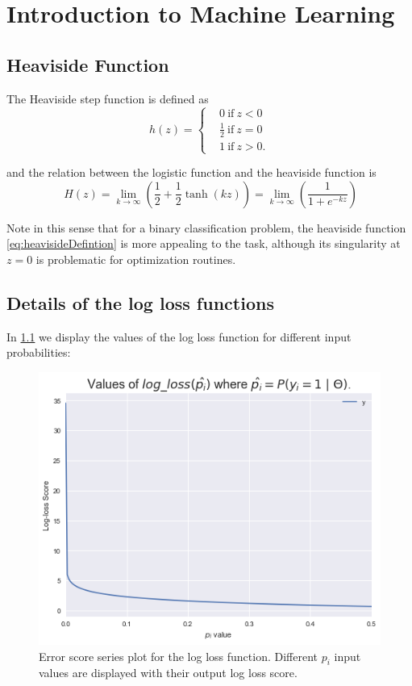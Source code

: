 \appendix
\chapter{Introduction to Machine Learning}\label{appx:introMachineLearning}

\section{Heaviside Function}\label{appx:sec:heaviside}

The Heaviside step function is defined as
\begin{equation}\label{eq:heavisideDefintion}
h(z) =
\begin{cases}
&0 \ \mbox{if} \ z<0 \\
&\frac{1}{2} \ \mbox{if} \ z=0 \\
&1 \ \mbox{if} \ z>0.
\end{cases}
\end{equation}

and the relation between the logistic function and the heaviside function is
\begin{equation}
 \ H(z) = \lim_{k \to \infty} \left(\frac{1}{2} + \frac{1}{2}\tanh(kz) \right) = \lim_{k \to \infty} \left(\frac{1}{1+e^{-kz}} \right)
\end{equation}

Note in this sense that for a binary classification problem, the heaviside function \cref{eq:heavisideDefintion} is more appealing to the task, although its singularity at $z=0$ is problematic for optimization routines.

\section{Details of the log loss functions}\label{appx:sec:loglossDetails}

In \cref{figure-logLossValues} we display the values of the log loss function for different input probabilities:

\begin{figure}[h!]
\begin{center}
\includegraphics[width=0.7\columnwidth]{figures/logloss/figure-logLossValues.png}
\caption{ Error score series plot for the log loss function.
Different $p_i$ input values are displayed with their output log loss score.}
\label{figure-logLossValues}
\end{center}
\end{figure}

